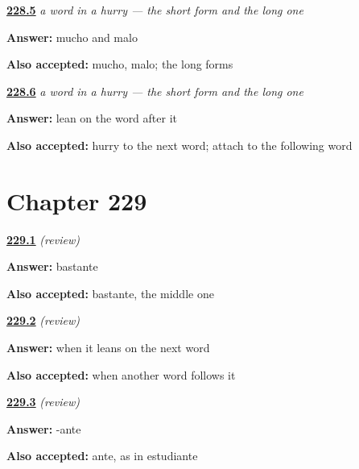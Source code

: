 \noindent\begin{minipage}[t]{\linewidth}
\raggedright
\hyperlink{review-ES-C60-apocope-which}{\textbf{228.5}} \emph{a word in a hurry — the short form and the long one}\par
\small \textbf{Answer:} mucho and malo\par
\footnotesize \textbf{Also accepted:} mucho, malo; the long forms
\end{minipage}\par\medskip

\noindent\begin{minipage}[t]{\linewidth}
\raggedright
\hyperlink{review-ES-C60-apocope-hear}{\textbf{228.6}} \emph{a word in a hurry — the short form and the long one}\par
\small \textbf{Answer:} lean on the word after it\par
\footnotesize \textbf{Also accepted:} hurry to the next word; attach to the following word
\end{minipage}\par\medskip

\section*{Chapter 229}

\noindent\begin{minipage}[t]{\linewidth}
\raggedright
\hyperlink{review-ES-C60-repaso-grado-scale}{\textbf{229.1}} \emph{(review)}\par
\small \textbf{Answer:} bastante\par
\footnotesize \textbf{Also accepted:} bastante, the middle one
\end{minipage}\par\medskip

\noindent\begin{minipage}[t]{\linewidth}
\raggedright
\hyperlink{review-ES-C60-repaso-grado-short}{\textbf{229.2}} \emph{(review)}\par
\small \textbf{Answer:} when it leans on the next word\par
\footnotesize \textbf{Also accepted:} when another word follows it
\end{minipage}\par\medskip

\noindent\begin{minipage}[t]{\linewidth}
\raggedright
\hyperlink{review-ES-C60-repaso-grado-ante}{\textbf{229.3}} \emph{(review)}\par
\small \textbf{Answer:} -ante\par
\footnotesize \textbf{Also accepted:} ante, as in estudiante
\end{minipage}\par\medskip

